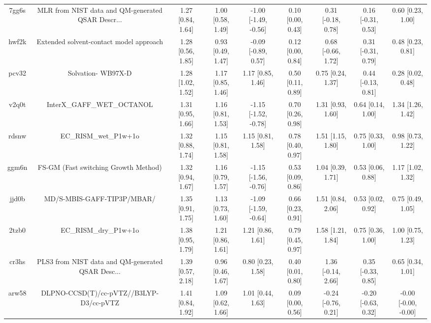 \documentclass{article}
\begin{document}
\begin{center}
\begin{longtable}{|ccccccccc|}
 7gg6s &  MLR from NIST data and QM-generated QSAR Descr... &  1.27 [0.84, 1.64] &  1.00 [0.58, 1.49] &  -1.00 [-1.49, -0.56] &  0.10 [0.00, 0.43] &   0.31 [-0.18, 0.78] &   0.16 [-0.31, 0.53] &     0.60 [0.23, 1.00] \\
 hwf2k &            Extended solvent-contact model approach &  1.28 [0.56, 1.85] &  0.93 [0.49, 1.47] &   -0.09 [-0.89, 0.57] &  0.12 [0.00, 0.84] &   0.68 [-0.66, 1.72] &   0.31 [-0.31, 0.79] &     0.48 [0.23, 0.81] \\
 pcv32 &                                 Solvation- WB97X-D &  1.28 [1.02, 1.52] &  1.17 [0.85, 1.46] &     1.17 [0.85, 1.46] &  0.50 [0.11, 0.89] &    0.75 [0.24, 1.37] &   0.44 [-0.13, 0.81] &     0.28 [0.02, 0.48] \\
 v2q0t &                         InterX\_GAFF\_WET\_OCTANOL &  1.31 [0.95, 1.66] &  1.16 [0.81, 1.53] &  -1.15 [-1.52, -0.78] &  0.70 [0.26, 0.98] &    1.31 [0.93, 1.60] &    0.64 [0.14, 1.00] &     1.34 [1.26, 1.42] \\
 rdsnw &                              EC\_RISM\_wet\_P1w+1o &  1.32 [0.88, 1.74] &  1.15 [0.81, 1.58] &     1.15 [0.81, 1.58] &  0.78 [0.40, 0.97] &    1.51 [1.15, 1.80] &    0.75 [0.33, 1.00] &     0.98 [0.73, 1.22] \\
 ggm6n &               FS-GM (Fast switching Growth Method) &  1.32 [0.94, 1.67] &  1.16 [0.79, 1.57] &  -1.15 [-1.56, -0.76] &  0.53 [0.09, 0.86] &    1.04 [0.39, 1.71] &    0.53 [0.06, 0.88] &     1.17 [1.02, 1.32] \\
 jjd0b &                         MD/S-MBIS-GAFF-TIP3P/MBAR/ &  1.35 [0.91, 1.75] &  1.13 [0.73, 1.60] &  -1.09 [-1.59, -0.64] &  0.66 [0.23, 0.91] &    1.51 [0.84, 2.06] &    0.53 [0.02, 0.92] &     0.75 [0.49, 1.05] \\
 2tzb0 &                              EC\_RISM\_dry\_P1w+1o &  1.38 [0.95, 1.79] &  1.21 [0.86, 1.61] &     1.21 [0.86, 1.61] &  0.79 [0.45, 0.97] &    1.58 [1.21, 1.84] &    0.75 [0.36, 1.00] &     1.00 [0.75, 1.23] \\
 cr3hs &  PLS3 from NIST data and QM-generated QSAR Desc... &  1.39 [0.57, 2.18] &  0.96 [0.46, 1.67] &     0.80 [0.23, 1.58] &  0.40 [0.01, 0.80] &   1.36 [-0.14, 2.66] &   0.35 [-0.33, 0.85] &     0.65 [0.34, 1.01] \\
 arw58 &            DLPNO-CCSD(T)/cc-pVTZ//B3LYP-D3/cc-pVTZ &  1.41 [0.84, 1.92] &  1.09 [0.62, 1.66] &     1.01 [0.44, 1.63] &  0.09 [0.00, 0.56] &  -0.24 [-0.76, 0.21] &  -0.20 [-0.63, 0.32] &  -0.00 [-0.00, -0.00] \\

\end{longtable}
\end{center}
\end{document}
